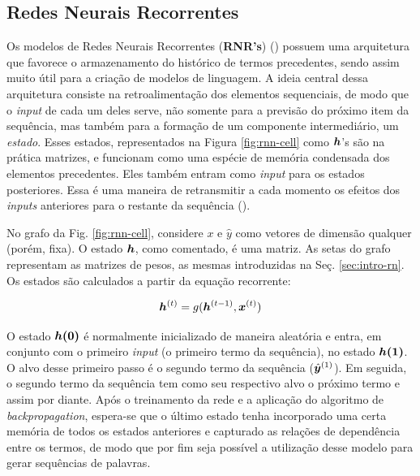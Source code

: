 
\subsection{Redes Neurais Recorrentes}
\label{sec:RNN}

Os modelos de Redes Neurais Recorrentes (\textbf{RNR's}) (\cite{Goodfellow-et-al-2016}) possuem uma arquitetura que favorece o armazenamento do histórico de termos precedentes, sendo assim muito útil para a criação de modelos de linguagem. A ideia central dessa arquitetura consiste na retroalimentação dos elementos sequenciais, de modo que o \textit{input} de cada um deles serve, não somente para a previsão do próximo item da sequência, mas também para a formação de um componente intermediário, um \textit{estado}. Esses estados, representados na Figura \ref{fig:rnn-cell} como $\bm{h}$'s são na prática matrizes, e funcionam como uma espécie de memória condensada dos elementos precedentes. Eles também entram como \textit{input }para os estados posteriores. Essa é uma maneira de retransmitir a cada momento os efeitos dos \textit{inputs} anteriores para o restante da sequência (\cite{Goodfellow-et-al-2016}). 



No grafo da Fig. \ref{fig:rnn-cell}, considere $x$ e $\hat{y}$ como vetores de dimensão qualquer (porém, fixa). O estado $\bm{h}$, como comentado, é uma matriz. As setas do grafo representam as matrizes de pesos, as mesmas introduzidas na Seç. \ref{sec:intro-rn}.
Os estados são calculados a partir da equação recorrente:

\begin{equation}
\bm{h}^{(t)} = g(\bm{h}^{(t-1)}, \bm{x}^{(t)})
\label{eq:rnn}
\end{equation}


O estado $\bm{h(0)}$ é normalmente inicializado de maneira aleatória e entra, em conjunto com o primeiro \textit{input} (o primeiro termo da sequência), no estado $\bm{h(1)}$. O alvo desse primeiro passo é o segundo termo da sequência ($\hat{\bm{y}}^{(1)}$). Em seguida, o segundo termo da sequência tem como seu respectivo alvo o próximo termo e assim por diante. Após o treinamento da rede e a aplicação do algoritmo de \textit{backpropagation}, espera-se que o último estado tenha incorporado uma certa memória de todos os estados anteriores e capturado as relações de dependência entre os termos, de modo que por fim seja possível a utilização desse modelo para gerar sequências de palavras. 

